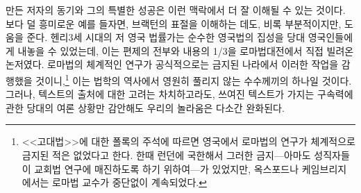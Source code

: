 만든 저자의 동기와 그의 특별한 성공은 이런 맥락에서
더 잘 이해될 수 있는 것이다.
보다 덜 흥미로운 예를 들자면, 브랙턴의 표절을 이해하는 데도,
비록 부분적이지만, 도움을 준다.
헨리3세 시대의 저 영국 법률가는
순수한 영국법의 집성을 당대 영국인들에게 내놓을 수 있었는데,
이는 편제의 전부와 내용의 1/3을 로마법대전에서 직접 빌려온 논저였다.
로마법의 체계적인 연구가 공식적으로는 금지된 나라에서
이러한 작업을 감행했을 것이니,\footnote{%
  <<고대법>>에 대한 폴록의 주석에 따르면 영국에서 로마법의 연구가
  체계적으로 금지된 적은 없었다고 한다. 한때 런던에 국한해서
  그러한 금지---아마도 성직자들이 교회법 연구에 매진하도록 하기 위하여---가
  있었지만, 옥스포드나 케임브리지에서는 로마법 교수가 중단없이
  계속되었다. }
이는 법학의 역사에서 영원히 풀리지 않는
수수께끼의 하나일 것이다.
그러나, 텍스트의 출처에 대한 고려는 차치하고라도,
쓰여진 텍스트가 가지는 구속력에 관한 당대의 여론 상황만 감안해도
우리의 놀라움은 다소간 완화된다.

